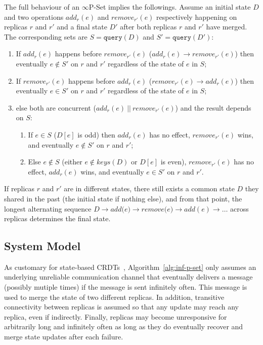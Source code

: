 \documentclass[9pt, oneside]{article}   	%
\begin{document}
The full behaviour of an $\infty$P-Set implies the followings. Assume an initial state $D$ and two operations $\textit{add}_r(e)$ and $\textit{remove}_{r'}(e)$ respectively happening on replicas $r$ and $r'$ and a final state $D'$ after both replicas $r$ and $r'$ have merged. The corresponding sets are $S=\texttt{query}(D)$ and $S'=\texttt{query}(D')$:
\begin{enumerate}
	\item If $\textit{add}_r(e)$ happens before $\textit{remove}_{r'}(e)$ ($\textit{add}_r(e)\rightarrow \textit{remove}_{r'}(e)$) then eventually $e \notin S'$ on $r$ and $r'$ regardless of the state of $e$ in $S$;
	\item  If $\textit{remove}_{r'}(e)$ happens before $\textit{add}_{r}(e)$ ($\textit{remove}_{r'}(e) \rightarrow  \textit{add}_r(e)$) then eventually $e \in S'$ on $r$ and $r'$ regardless of the state of $e$ in $S$;
	\item else both are concurrent ($add_r(e) ~||~ remove_{r'}(e)$) and the result depends on $S$:
	    \begin{enumerate}
		\item	 If $e \in S$ ($D[e]$ is odd) then $add_r(e)$ has no effect, $remove_{r'}(e)$ wins, and eventually $e \notin S'$ on $r$ and $r'$;
		\item Else $e \notin S$ (either $e \notin \textit{keys}(D)$ or $D[e]$ is even), $remove_{r'}(e)$  has no effect, $add_r(e)$ wins, and eventually $e \in S'$ on $r$ and $r'$.
	    \end{enumerate}
\end{enumerate}

If replicas $r$ and $r'$ are in different states, there still exists a common state $D$ they shared in the past (the initial state if nothing else), and from that point, the longest alternating sequence $D \rightarrow \textit{add(e)} \rightarrow \textit{remove(e)}\rightarrow \textit{add}(e) \rightarrow \dots $ across replicas determines the final state.

\subsection{System Model}
\label{sec:system-model}

As customary for state-based CRDTs~\cite{shapiro:inria-00555588}, Algorithm~\ref{alg:inf-p-set} only assumes an underlying unreliable communication channel that eventually delivers  a message (possibly mutiple times) if the message is sent infinitely often. This message is used to merge the state of two different replicas. In addition, transitive connectivity between replicas is assumed so that any update may reach any replica, even if indirectly. Finally, replicas may become unresponsive for arbitrarily long and infinitely often as long as they do eventually recover and merge state updates after each failure.
\end{document}
